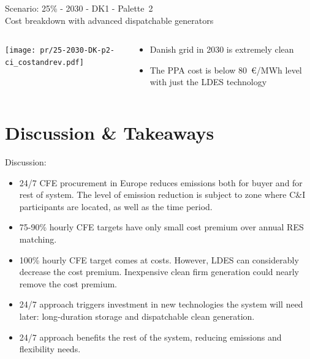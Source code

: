 \begin{frame}{Scenario: 25\% - 2030 - DK1 - Palette~2 \\ 
Cost breakdown with advanced dispatchable generators}

\begin{columns}[T]
\begin{column}{9cm}
\centering

\texttt{[image: pr/25-2030-DK-p2-ci\_costandrev.pdf]}
\end{column}
\begin{column}{5cm}

\begin{itemize}
  \item Danish grid in 2030 is \alert{extremely clean}
  \item The PPA cost is below 80~€/MWh level with just the LDES technology
\end{itemize}
  
\end{column}
\end{columns}

\end{frame}


\section{Discussion \& Takeaways}


\begin{frame}{Discussion:}

  \begin{itemize}
  \item 24/7 CFE procurement in Europe \alert{reduces emissions} both for buyer and for rest of system. The level of emission reduction is subject to zone where C\&I participants are located, as well as the time period.
  \item 75-90\% hourly CFE targets have \alert{only small cost premium} over annual RES matching.
  \item 100\% hourly CFE target \alert{comes at costs}. However, LDES can considerably decrease the cost premium. Inexpensive clean firm generation could nearly remove the cost premium.   
  \item 24/7 approach \alert{triggers investment in new technologies} the system will need later: long-duration storage and dispatchable clean generation.
  \item 24/7 approach \alert{benefits the rest of the system}, reducing emissions and flexibility needs.
  \end{itemize}

\end{frame}

